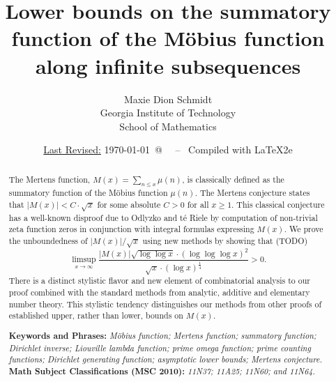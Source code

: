 \documentclass[11pt,reqno,a4letter]{article}
\title{
       \LARGE{
       Lower bounds on the summatory function of the M\"obius function along infinite subsequences 
       } 
}
\author{{\Large Maxie Dion Schmidt} \\ 
        {\normalsize Georgia Institute of Technology} \\[0.025cm] 
        {\normalsize School of Mathematics} 
}
\date{\small\underline{Last Revised:} \today \ @\ \hhmmsstime{} \ -- \ Compiled with \LaTeX2e}
\numberwithin{figure}{section}
\numberwithin{table}{section}
\theoremstyle{plain}
\numberwithin{theorem}{section}
\theoremstyle{definition}
\begin{document}
 

\maketitle

\begin{abstract} 
The Mertens function, $M(x) = \sum_{n \leq x} \mu(n)$, is classically 
defined as the summatory function of the M\"obius function $\mu(n)$. 
The Mertens conjecture states that $|M(x)| < C \cdot \sqrt{x}$ for some absolute $C > 0$ for all 
$x \geq 1$. 
This classical conjecture has a well-known disproof due to 
Odlyzko and t\'{e} Riele by computation of 
non-trivial zeta function zeros in conjunction with integral formulas expressing $M(x)$. 
We prove the unboundedness of $|M(x)| / \sqrt{x}$ using new methods by showing that 
(TODO) 
$$\limsup_{x \rightarrow \infty} \frac{|M(x)| \sqrt{\log\log x} \cdot (\log\log\log x)^{2}}{ 
  \sqrt{x} \cdot (\log x)^{\frac{1}{4}}} > 0.$$ 
There is a distinct stylistic 
flavor and new element of combinatorial analysis to our proof 
combined with the standard methods from analytic, additive and elementary number theory. 
This stylistic tendency distinguishes 
our methods from other proofs of established upper, rather than lower, bounds on $M(x)$. 

\bigskip 
\noindent
\textbf{Keywords and Phrases:} {\it M\"obius function; Mertens function; summatory function; 
                                    Dirichlet inverse; Liouville lambda function; prime omega function; 
                                    prime counting functions; Dirichlet generating function; 
                                    asymptotic lower bounds; Mertens conjecture. } \\ 
\textbf{Math Subject Classifications (MSC 2010):} {\it 11N37; 11A25; 11N60; and 11N64. } 
\end{abstract} 

\end{document}
